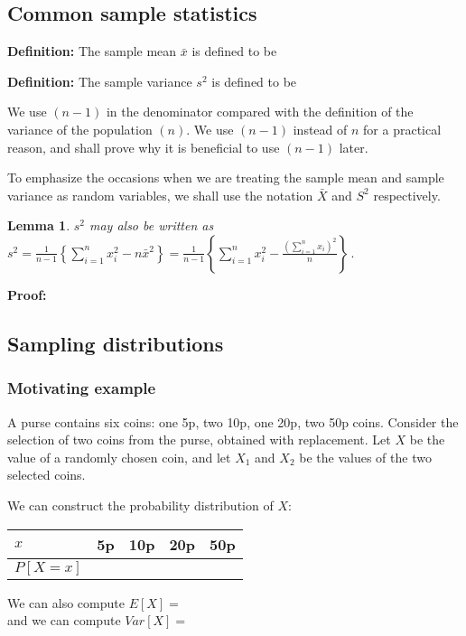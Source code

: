 \documentclass[12pt]{article}
\newtheorem{lemma}[theorem]{Lemma}
\begin{document}
\subsection{Common sample statistics}
\begin{mdframed}
{\bf Definition:} The sample mean $\bar{x}$ is defined to be
\textcolor[rgb]{1.00,1.00,1.00}{\lipsum[1]}
\end{mdframed}

\begin{mdframed}
{\bf Definition:} The sample variance $s^{2}$ is defined to be
\textcolor[rgb]{1.00,1.00,1.00}{\lipsum[1]}
\end{mdframed}
We use $(n-1)$  in the denominator compared with the definition of the variance of the population $(n)$.  We use $(n-1)$  instead of $n$ for a practical reason, and shall prove why it is beneficial to use $(n-1)$ later.

To emphasize the occasions when we are treating the sample mean and sample variance as random variables, we shall use the notation $\bar{X}$ and $S^{2}$ respectively.

\begin{lemma}
$s^2$ may also be written as $\displaystyle s^{2}=\frac{1}{n-1}\left\{\sum_{i=1}^{n}x_{i}^{2}-n\bar{x}^{2}\right\}=\frac{1}{n-1}\left\{\sum_{i=1}^{n}x_{i}^{2}-\frac{\left(\sum_{i=1}^{n}x_{i}\right)^{2}}{n}\right\}\, .$
\end{lemma}
\begin{mdframed}
{\bf Proof:}
\textcolor[rgb]{1.00,1.00,1.00}{\lipsum[1-3]}
\end{mdframed}

\subsection{Sampling distributions}
\subsubsection{Motivating example}
A purse contains six coins: one 5p, two 10p, one 20p, two 50p coins.  Consider the selection of two coins from the purse, obtained with replacement. Let $X$ be the value of a randomly chosen coin, and let $X_{1}$ and $X_{2}$ be the values of the two selected coins.

We can construct the probability distribution of $X$:
\begin{center}
\begin{tabular}{|l|c|c|c|c|}
  \hline
  $x$ & 5p & 10p & 20p & 50p \\ [8pt] \hline
  $P[X=x]$ & \hspace{1.5cm} & \hspace{1.5cm}  & \hspace{1.5cm}  & \hspace{1.5cm} \\ [8pt]
  \hline
\end{tabular}
\end{center}
We can also compute $E[X]=$\\[75pt]
and we can compute $Var[X]=$
\end{document}
